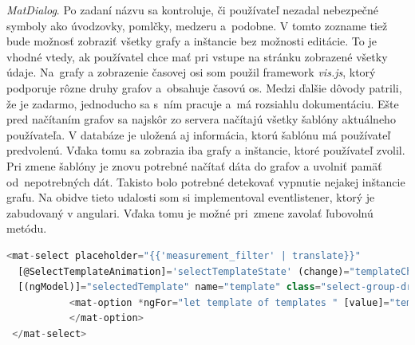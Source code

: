 \documentclass[11pt, oneside]{report}
\begin{document}
\textit{MatDialog}. Po zadaní názvu sa kontroluje, či používateľ nezadal nebezpečné symboly ako úvodzovky, pomlčky, medzeru  a~podobne. V tomto zozname tiež bude možnosť zobraziť všetky grafy a inštancie bez možnosti editácie. To je vhodné vtedy, ak používatel chce mať pri vstupe na stránku zobrazené všetky údaje.  Na~grafy a zobrazenie časovej osi som použil framework \textit{vis.js}, ktorý podporuje rôzne druhy grafov a~obsahuje časovú os. Medzi ďalšie dôvody patrili, že je zadarmo, jednoducho sa s~ním pracuje a~má rozsiahlu dokumentáciu.  Ešte pred načítaním grafov sa  najskôr zo servera načítajú všetky šablóny aktuálneho používateľa. V databáze je uložená aj informácia, ktorú šablónu má používateľ predvolenú. Vďaka tomu sa zobrazia iba grafy a inštancie, ktoré používateľ zvolil. Pri zmene šablóny je znovu potrebné načítať dáta do grafov a uvolniť pamäť od~nepotrebných dát. Takisto bolo potrebné detekovať vypnutie nejakej inštancie grafu. Na obidve tieto udalosti som si implementoval eventlistener, ktorý je zabudovaný v angulari. Vďaka tomu je možné pri~zmene zavolať ľubovolnú metódu. 
\begin{lstlisting}[language=Javascript,showstringspaces=false,label=angular1,caption=Selectlist pre zvolenie šablóny s využitím nástrojov angularu,captionpos=b]
 <mat-select placeholder="{{'measurement_filter' | translate}}"
  [@SelectTemplateAnimation]='selectTemplateState' (change)="templateChanged()"
  [(ngModel)]="selectedTemplate" name="template" class="select-group-dropdown">
           <mat-option *ngFor="let template of templates " [value]="template">               
           </mat-option>
 </mat-select>
\end{lstlisting}
\end{document}
